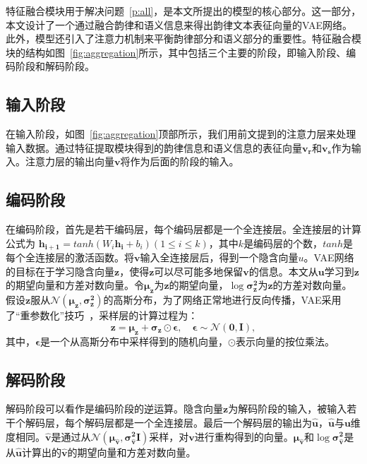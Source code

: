 特征融合模块用于解决问题~\ref{p:all}，是本文所提出的模型的核心部分。这一部分，本文设计了一个通过融合韵律和语义信息来得出韵律文本表征向量的VAE网络。此外，模型还引入了注意力机制来平衡韵律部分和语义部分的重要性。特征融合模块的结构如图~\ref{fig:aggregation}所示，其中包括三个主要的阶段，即输入阶段、编码阶段和解码阶段。\par

\subsection{输入阶段}
在输入阶段，如图~\ref{fig:aggregation}顶部所示，我们用前文提到的注意力层来处理输入数据。通过特征提取模块得到的韵律信息和语义信息的表征向量$\bm{v_r}$和$\bm{v_s}$作为输入。注意力层的输出向量$\bm v$将作为后面的阶段的输入。\par

\subsection{编码阶段}
在编码阶段，首先是若干编码层，每个编码层都是一个全连接层。全连接层的计算公式为 $\bm{h_{i+1}}=tanh(W_i \bm{h_i}+b_i)(1 \leq i \leq k)$，其中$k$是编码层的个数，$tanh$是每个全连接层的激活函数。将$\bm v$输入全连接层后，得到一个隐含向量$u$。VAE网络的目标在于学习隐含向量$\bm z$，使得$\bm z$可以尽可能多地保留$\bm v$的信息。本文从$\bm u$学习到$\bm z$的期望向量和方差对数向量。令$\bm{\mu_z}$为$\bm z$的期望向量，$\log\bm{\sigma_z^2}$为$\bm z$的方差对数向量。假设$\bm z$服从${\mathcal{N}(\bm {\mu_z},\bm{\sigma_z^2})}$的高斯分布，为了网络正常地进行反向传播，VAE采用了“重参数化”技巧~\autocite{kingma2014auto}，采样层的计算过程为：
\begin{equation}
  \bm{z}=\bm{\mu_z}+\bm{\sigma_z}\odot \bm{\epsilon},\quad \bm \epsilon \sim \bm{\mathcal{N}(0, \bm I)},
\end{equation}
其中，$\bm \epsilon$是一个从高斯分布中采样得到的随机向量，$\odot$表示向量的按位乘法。\par

\subsection{解码阶段}
解码阶段可以看作是编码阶段的逆运算。隐含向量$\bm z$为解码阶段的输入，被输入若干个解码层，每个解码层都是一个全连接层。最后一个解码层的输出为$\bm{\hat u}$，$\bm{\hat u}$与$\bm u$维度相同。$\bm{\hat v}$是通过从${\mathcal{N}(\bm {\mu_{\hat v}},\bm{\sigma_{\hat v}^2I})}$采样，对$\bm v$进行重构得到的向量。$\bm {\mu_{\hat v}}$和$\log\bm{\sigma_{\hat v}^2}$是从$\bm{\hat u}$计算出的$\bm{\hat v}$的期望向量和方差对数向量。\par


